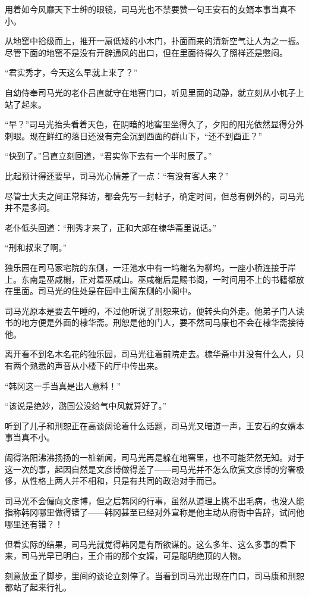 用着如今风靡天下士绅的眼镜，司马光也不禁要赞一句王安石的女婿本事当真不小。

从地窖中拾级而上，推开一扇低矮的小木门，扑面而来的清新空气让人为之一振。尽管下面的地窖不是没有开辟通风的出口，但在里面待得久了照样还是憋闷。

“君实秀才，今天这么早就上来了？”

自幼侍奉司马光的老仆吕直就守在地窖门口，听见里面的动静，就立刻从小杌子上站了起来。

“早？”司马光抬头看着天色，在阴暗的地窖里坐得久了，夕阳的阳光依然显得分外刺眼。现在鲜红的落日还没有完全沉到西面的群山下，“还不到酉正？”

“快到了。”吕直立刻回道，“君实你下去有一个半时辰了。”

比起预计得还要早，司马光心情差了一点：“有没有客人来？”

尽管士大夫之间正常拜访，都会先写一封帖子，确定时间，但总有例外的，司马光并不是多问。

老仆低头回道：“刑秀才来了，正和大郎在棣华斋里说话。”

“刑和叔来了啊。”

独乐园在司马家宅院的东侧，一汪池水中有一坞榭名为柳坞，一座小桥连接于岸上。东南是巫咸榭，正对着巫咸山。巫咸榭后是赐书阁，一时间用不上的书籍都放在里面。司马光的住处是在园中主阁东侧的小阁中。

司马光原本是要去午睡的，不过他听说了刑恕来访，便转头向外走。他弟子门人读书的地方便是外面的棣华斋。刑恕是他的门人，要不然司马康也不会在棣华斋接待他。

离开看不到名木名花的独乐园，司马光往着前院走去。棣华斋中并没有什么人，只有两个熟悉的声音从小楼下的厅中传出来。

“韩冈这一手当真是出人意料！”

“该说是绝妙，潞国公没给气中风就算好了。”

听到了儿子和刑恕正在高谈阔论着什么话题，司马光又暗道一声，王安石的女婿本事当真不小。

闹得洛阳沸沸扬扬的一桩新闻，司马光再是躲在地窖里，也不可能茫然无知。对于这一次的事，起因自然是文彦博做得差了——司马光并不怎么欣赏文彦博的穷奢极侈，从性格上两人并不相和，只是有共同的政治对手而已。

司马光不会偏向文彦博，但之后韩冈的行事，虽然从道理上挑不出毛病，也没人能指称韩冈哪里做得错了——韩冈甚至已经对外宣称是他主动从府衙中告辞，试问他哪里还有错？！

但看实际的结果，司马光就觉得韩冈是有所欲谋的。这么多年、这么多事的看下来，司马光早已明白，王介甫的那个女婿，可是聪明绝顶的人物。

刻意放重了脚步，里间的谈论立刻停了。当看到司马光出现在门口，司马康和刑恕都站了起来行礼。

